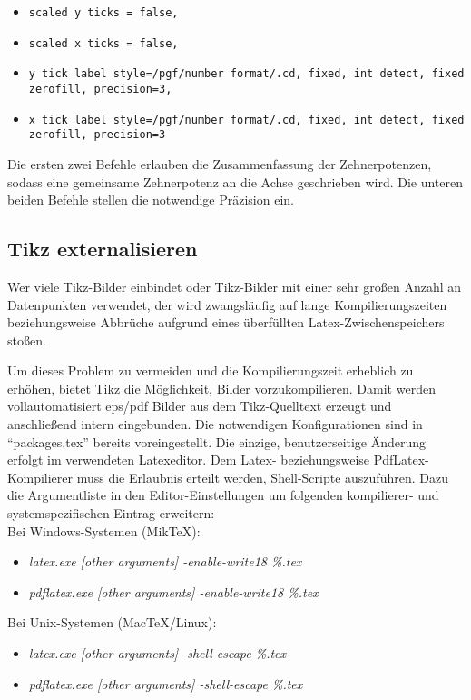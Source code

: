 \begin{itemize}
         \item \texttt{scaled y ticks = false,} 
         \item \texttt{scaled x ticks = false,}
         \item \texttt{y tick label style={/pgf/number format/.cd, fixed, int detect, fixed zerofill, precision=3},}
         \item \texttt{x tick label style={/pgf/number format/.cd, fixed, int detect, fixed zerofill, precision=3}}
\end{itemize}

Die ersten zwei Befehle erlauben die Zusammenfassung der Zehnerpotenzen, sodass eine gemeinsame Zehnerpotenz an die Achse geschrieben wird.
Die unteren beiden Befehle stellen die notwendige Präzision ein.

\subsection{Tikz externalisieren}

Wer viele Tikz-Bilder einbindet oder Tikz-Bilder mit einer sehr großen Anzahl an Datenpunkten verwendet, der wird zwangsläufig 
auf lange Kompilierungszeiten beziehungsweise Abbrüche aufgrund eines überfüllten Latex-Zwischenspeichers stoßen.

Um dieses Problem zu vermeiden und die Kompilierungszeit erheblich zu erhöhen, bietet Tikz die Möglichkeit, Bilder vorzukompilieren. Damit werden vollautomatisiert eps/pdf Bilder aus dem Tikz-Quelltext erzeugt und anschließend intern eingebunden.
Die notwendigen Konfigurationen sind in "`packages.tex"' bereits voreingestellt. Die einzige, benutzerseitige Änderung erfolgt im verwendeten Latexeditor. Dem Latex- beziehungsweise PdfLatex-Kompilierer muss die Erlaubnis erteilt werden,
Shell-Scripte auszuführen.
Dazu die Argumentliste in den Editor-Einstellungen um folgenden kompilierer- und systemspezifischen Eintrag erweitern:\\

Bei Windows-Systemen (MikTeX):
\begin{itemize}
	\item	\textit{latex.exe [other arguments] -enable-write18 \%.tex}
 	\item 	\textit{ pdflatex.exe [other arguments] -enable-write18 \%.tex}
\end{itemize}

Bei Unix-Systemen (MacTeX/Linux):
\begin{itemize}
	\item	\textit{latex.exe [other arguments] -shell-escape \%.tex}
	\item 	\textit{pdflatex.exe [other arguments] -shell-escape \%.tex}
\end{itemize}

